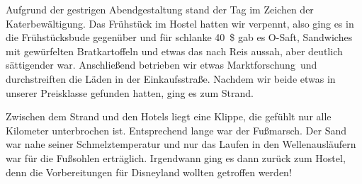Aufgrund der gestrigen Abendgestaltung stand der Tag im Zeichen der Katerbewältigung.
Das Frühstück im Hostel hatten wir verpennt, also ging es in die Frühstücksbude gegenüber und für schlanke 40~\$ gab es O-Saft, Sandwiches mit gewürfelten Bratkartoffeln und etwas das nach Reis aussah, aber deutlich sättigender war.
Anschließend betrieben wir etwas \glqq Marktforschung\grqq \, und durchstreiften die Läden in der Einkaufsstraße.
Nachdem wir beide etwas in unserer Preisklasse gefunden hatten, ging es zum Strand.

Zwischen dem Strand und den Hotels liegt eine Klippe, die gefühlt nur alle Kilometer unterbrochen ist.
Entsprechend lange war der Fußmarsch.
Der Sand war nahe seiner Schmelztemperatur und nur das Laufen in den Wellenausläufern war für die Fußsohlen erträglich.
Irgendwann ging es dann zurück zum Hostel, denn die Vorbereitungen für Disneyland wollten getroffen werden!

